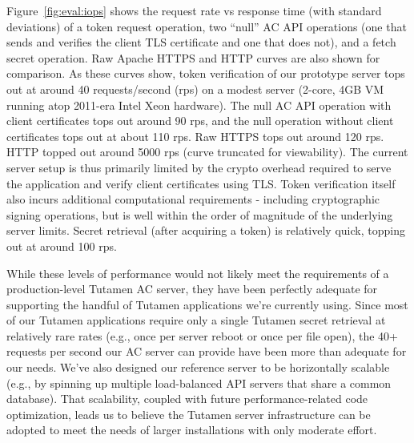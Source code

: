 Figure~\ref{fig:eval:iops} shows the request rate vs response time
(with standard deviations) of a token request operation, two ``null''
AC API operations (one that sends and verifies the client TLS
certificate and one that does not), and a fetch secret operation. Raw
Apache HTTPS and HTTP curves are also shown for comparison. As these
curves show, token verification of our prototype server tops out at
around 40 requests/second (rps) on a modest server (2-core, 4GB VM
running atop 2011-era Intel Xeon hardware). The null AC API operation
with client certificates tops out around 90 rps, and the null
operation without client certificates tops out at about 110 rps. Raw
HTTPS tops out around 120 rps. HTTP topped out around 5000 rps (curve
truncated for viewability). The current server setup is thus primarily
limited by the crypto overhead required to serve the application and
verify client certificates using TLS. Token verification itself also
incurs additional computational requirements - including cryptographic
signing operations, but is well within the order of magnitude of the
underlying server limits. Secret retrieval (after acquiring a token)
is relatively quick, topping out at around 100 rps.

While these levels of performance would not likely meet the
requirements of a production-level Tutamen AC server, they have been
perfectly adequate for supporting the handful of Tutamen applications
we're currently using. Since most of our Tutamen applications require
only a single Tutamen secret retrieval at relatively rare rates (e.g.,
once per server reboot or once per file open), the 40+ requests per
second our AC server can provide have been more than adequate for our
needs. We've also designed our reference server to be horizontally
scalable (e.g., by spinning up multiple load-balanced API servers that
share a common database). That scalability, coupled with future
performance-related code optimization, leads us to believe the Tutamen
server infrastructure can be adopted to meet the needs of larger
installations with only moderate effort.


